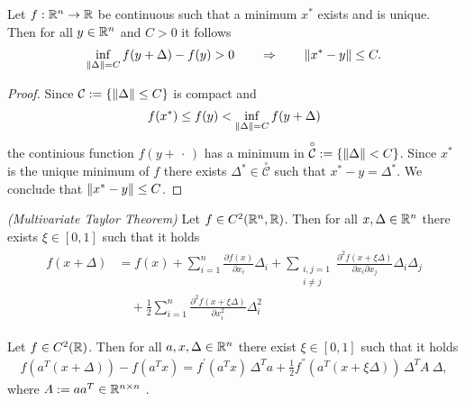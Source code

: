 \begin{proposition}
  Let 
  $f : \mathbb{R}^n \to \mathbb{R}$ 
  be continuous such that 
  a minimum $x^*$ exists and is unique.
  Then 
  for all $y \in \mathbb{R}^n$ and $C>0$ 
  it follows
    \begin{gather}
      \inf_{\left\lVert\Delta\right\rVert=C} f(y+\Delta) - f(y) > 0 \qquad
      \Rightarrow \qquad 
      \left\lVert x^* - y\right\rVert \le C.
    \end{gather}
\end{proposition}


\begin{proof}
Since 
$\mathcal{C}:=\left\{ \left\lVert\Delta\right\rVert\le C \right\}$
is compact and
\begin{gather*}
  f(x^*) \le f(y) <  \inf_{\left\lVert\Delta\right\rVert=C} f(y+\Delta)
\end{gather*}
the continious function $f(y+\,\cdot\,)$ has a minimum in 
$\overset{\circ}{\mathcal{C}}:=\left\{ \left\lVert\Delta\right\rVert < C \right\}$. 
Since 
$x^*$ is the unique minimum of $f$
there exists $\Delta^* \in \overset{\circ}{\mathcal{C}}$ 
such that 
$x^* - y = \Delta^*$.
We conclude that
$\left\lVert x^* - y\right\rVert \le C$.
\end{proof}



\begin{theorem}
  \emph{(Multivariate Taylor Theorem)}
  Let 
  $f \in C^2(\mathbb{R}^n, \mathbb{R})$.
  Then 
  for all $x, \Delta \in \mathbb{R}^n$
  there exists $\xi \in [0,1]$
  such that 
  it holds
  \begin{align}
    \label{syu_taylor}
    \begin{split}
    f(x + \Delta)
    &=
    f(x)
    +
    \sum_{i = 1}^{n} \frac{\partial f(x)}{\partial x_i} \Delta_i    
    + 
    \sum_{
    \begin{smallmatrix}
      i,j = 1 \\ 
      i \neq j
    \end{smallmatrix}
    }
    \frac{\partial^2 f(x + \xi \Delta)}{\partial x_i \partial x_j} \Delta_i\Delta_j
    \\
    & \quad+ 
    \frac{1}{2}\sum_{i = 1}^{n} \frac{\partial^2 f(x + \xi \Delta)}{\partial x_i^2}\Delta_i^2 
    \end{split}
  \end{align}
\end{theorem}


\begin{corollary}
  Let 
  $f\in C^2(\mathbb{R})$. 
  Then
  for all $a,x,\Delta \in \mathbb{R}^n$ 
  there exist $\xi \in [0,1]$ 
  such that it holds
  \begin{gather}
    \label{syu_2.result}
    f(a^T (x + \Delta)) - f(a^T x) = 
    f^{'}(a^T x)\, \Delta^T a + 
    \frac{1}{2}f^{''}(a^T (x + \xi \Delta))\, \Delta^T A\ \Delta,
  \end{gather}
  where 
  $A:= a a^T \in \mathbb{R}^{n \times n}$ .
\end{corollary}


